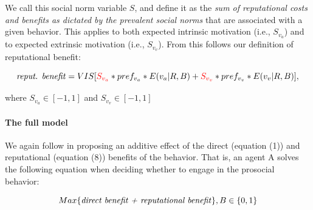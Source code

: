 \documentclass[AER]{AEA}
\begin{document}
We call this social norm variable $S$, and define it as the \textit{sum of reputational costs and benefits as dictated by the prevalent social norms} that are associated with a given behavior. This applies to both expected intrinsic motivation (i.e., $S_{v_{a}}$) and to expected extrinsic motivation (i.e., $S_{v_{v}}$). From this follows our definition of reputational benefit:

\begin{equation} 
 \mbox{\textit{reput. benefit}} =  VIS[\mathbin{\color{red}\textbf{$S_{v_{a}}$}} * pref_{v_{a}} * E(v_{a} | R, B) + \mathbin{\color{red}\textbf{$S_{v_{v}}$}} * pref_{v_{v}} * E(v_{v} | R, B)],
\end{equation}

\hspace{0.2 cm} where $S_{v_{a}} \in [-1,1]$ and $S_{v_{v}} \in [-1,1]$





\paragraph{The full model}

We again follow \cite{benabou_incentives_2006} in proposing an additive effect of the direct (equation (1)) and reputational (equation (8)) benefits of the behavior. That is, an agent A solves the following equation when deciding whether to engage in the prosocial behavior: 

\begin{equation} 
 Max		\{ \mbox{\textit{direct benefit + reputational benefit}} \}, B \in \{0,1\}
\end{equation}




\end{document}
